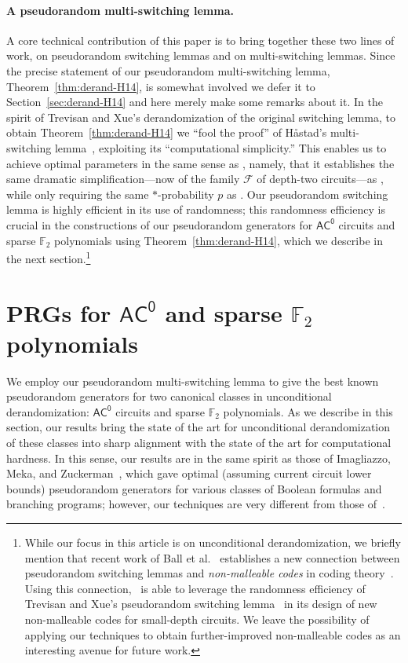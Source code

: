 \documentclass[11pt]{article}
\numberwithin{equation}{section}
\theoremstyle{definition}
\theoremstyle{plain}
\theoremstyle{plain}
\newcommand{\acz}{\mathsf{AC^0}}
\renewcommand{\F}{\mathds{F}}
\begin{document}
\vspace{-5pt}
\paragraph{A pseudorandom multi-switching lemma.}  A core technical contribution of this paper is to bring together these two lines of work, on pseudorandom switching lemmas and on multi-switching lemmas.  
Since the precise statement of our pseudorandom multi-switching lemma, Theorem~\ref{thm:derand-H14}, is somewhat involved we defer it to Section~\ref{sec:derand-H14} and here merely make some remarks about it. 
In the spirit of Trevisan and Xue's derandomization of the original switching lemma, to obtain Theorem~\ref{thm:derand-H14} we ``fool the proof'' of H{\aa}stad's multi-switching lemma~\cite{Has14}, exploiting its ``computational simplicity.''   This enables us to achieve optimal parameters in the same sense as \cite{TX13}, namely, that it establishes the same dramatic simplification---now of the family $\mathscr{F}$ of depth-two circuits---as \cite{Has14},
%
while only requiring the same $\ast$-probability $p$ as \cite{Has14}. Our pseudorandom switching lemma is highly efficient in its use of randomness;
this randomness efficiency is crucial in the constructions of our pseudorandom generators for $\acz$ circuits and sparse $\F_2$ polynomials using Theorem~\ref{thm:derand-H14}, which we %
describe in the next section.\footnote{While our focus in this
%
article  %
is on unconditional derandomization, we briefly mention that recent work of Ball et al.~\cite{BDGMT18} establishes a new connection between pseudorandom switching lemmas and \emph{non-malleable codes} in coding theory~\cite{DPW18}.  Using this connection,~\cite{BDGMT18} 
%
is %
able to leverage the randomness efficiency
%
of Trevisan and Xue's pseudorandom switching lemma~\cite{TX13}
%
in its  %
design of new non-malleable codes for small-depth circuits.  We leave the possibility of applying our techniques to obtain further-improved non-malleable codes as an interesting avenue for future work. }

\section{PRGs for $\acz$ and sparse $\F_2$ polynomials} \label{sec:applic}

We employ our pseudorandom multi-switching lemma to give the best known pseudorandom generators for two canonical classes in unconditional derandomization: $\acz$ circuits and sparse $\F_2$ polynomials. 
As we describe in this section, our results bring the state of the art for unconditional derandomization of these classes into sharp alignment with the state of the art for computational hardness.
%
%
%
%
%
%
%
 In this sense, our results are in the same spirit as those of Imagliazzo, Meka, and Zuckerman~\cite{IMZ12journal}, which gave optimal (assuming current circuit lower bounds) pseudorandom generators for various classes of Boolean formulas and branching programs; however, our techniques are very different from those of~\cite{IMZ12journal}. 
\end{document}
